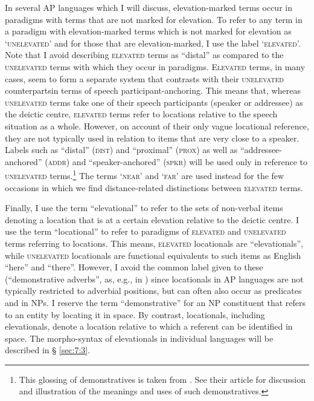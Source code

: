 In several AP languages which I will discuss, elevation-marked terms occur in paradigms with terms that are not marked for elevation. To refer to any term in a paradigm with elevation-marked terms which is not marked for elevation as `\textsc{unelevated}' and for those that are elevation-marked, I use the label `\textsc{elevated'.} Note that I avoid describing \textsc{elevated} terms as ``distal'' as compared to the \textsc{unelevated} terms with which they occur in paradigms. E\textsc{levated} terms, in many cases, seem to form a separate system that contrasts with their \textsc{unelevated} counterpartsin terms of speech participant-anchoring. This means that, whereas \textsc{unelevated} terms take one of their speech participants (speaker or addressee) as the deictic centre, \textsc{elevated} terms refer to locations relative to the speech situation as a whole. However, on account of their only vague locational reference, they are not typically used in relation to items that are very close to a speaker. Labels such as ``distal'' (\textsc{dist}) and ``proximal'' (\textsc{prox}) as well as ``addressee-anchored'' (\textsc{addr)} and ``speaker-anchored'' (\textsc{spkr)} will be used only in reference to \textsc{unelevated} terms.\footnote{This glossing of demonstratives is taken from  \citet{SchapperEtAl2011}. See their article for discussion and illustration of the meanings and uses of such demonstratives.} The terms `\textsc{near}' and `\textsc{far'} are used instead for the few occasions in which we find distance-related distinctions between \textsc{elevated} terms.

Finally, I use the term ``elevational'' to refer to the sets of non-verbal items denoting a location that is at a certain elevation relative to the deictic centre. I use the term ``locational'' to refer to paradigms of \textsc{elevated} and \textsc{unelevated} terms referring to locations. This means, \textsc{elevated} locationals are ``elevationals'', while \textsc{unelevated} locationals are functional equivalents to such items as English ``here'' and ``there''. However, I avoid the common label given to these (``demonstrative adverbs'', as, e.g., in \citealt{Diessel1999}) since locationals in AP languages are not typically restricted to adverbial positions, but can often also occur as predicates and in NPs. I reserve the term ``demonstrative'' for an NP constituent that refers to an entity by locating it in space. By contrast, locationals, including elevationals, denote a location relative to which a referent can be identified in space. The morpho-syntax of elevationals in individual languages will be described in {\S} \ref{sec:7:3}.

